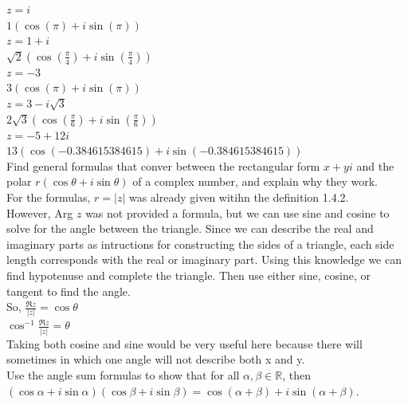 \documentclass[12pt]{article}
\begin{document}
 $z = i$\\
$1(\cos(\pi) + i\sin(\pi))$\\


 $z = 1 + i$\\
$\sqrt{2}(\cos(\frac{\pi}{4}) + i\sin(\frac{\pi}{4}))$\\


 $z = -3$\\
$3(\cos(\pi) + i\sin(\pi))$\\


 $z = 3 - i\sqrt{3}$\\
$2\sqrt{3}(\cos(\frac{\pi}{6}) + i\sin(\frac{\pi}{6}))$\\


 $z = -5 + 12i$\\
$13(\cos(-0.384615384615) + i\sin(-0.384615384615))$\\


 Find general formulas that conver between the rectangular form $x + yi$ and the polar $r(\cos\theta + i\sin\theta)$ of a complex number, and explain why they work.\\
For the formulas, $r = |z|$ was already given witihn the definition 1.4.2.\\

However, Arg $z$ was not provided a formula, but we can use sine and cosine to solve for the angle between the triangle. 
Since we can describe the real and imaginary parts as intructions for constructing the sides of a triangle, each side length corresponds with the real or imaginary part.
Using this knowledge we can find hypotenuse and complete the triangle. Then use either sine, cosine, or tangent to find the angle.\\

So, $\frac{\Re{z}}{|z|} = \cos\theta$\\
$\cos^{-1}{\frac{\Re{z}}{|z|}} = \theta$\\

Taking both cosine and sine would be very useful here because there will sometimes in which one angle will not describe both x and y.\\

 Use the angle sum formulas to show that for all $\alpha, \beta \in \mathbb{R}$, then\\
$(\cos\alpha + i\sin\alpha)(\cos\beta + i\sin\beta) = \cos(\alpha + \beta) + i\sin(\alpha + \beta)$.\\
\end{document}
